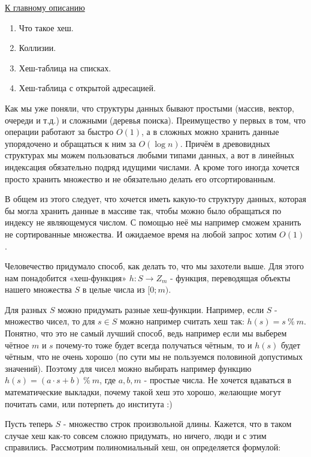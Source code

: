 \label{md2tex13}
\hyperref[md2texREADME]{К главному описанию}


\begin{enumerate}
    \item Что такое хеш.
    \item Коллизии.
    \item Хеш-таблица на списках.
    \item Хеш-таблица с открытой адресацией.
\end{enumerate}


Как мы уже поняли, что структуры данных бывают простыми (массив, вектор, очереди и т.д.) и сложными (деревья поиска). Преимущество у первых в том, что операции работают за быстро $O(1)$, а в сложных можно хранить данные упорядочено и обращаться к ним за $O(\log n)$. Причём в древовидных структурах мы можем пользоваться любыми типами данных, а вот в линейных индексация обязательно подряд идущими числами. А кроме того иногда хочется просто хранить множество и не обязательно делать его отсортированным.

В общем из этого следует, что хочется иметь какую-то структуру данных, которая бы могла хранить данные в массиве так, чтобы можно было обращаться по индексу не являющемуся числом. С помощью неё мы например сможем хранить не сортированные множества. И ожидаемое время на любой запрос хотим $O(1)$.


Человечество придумало способ, как делать то, что мы захотели выше. Для этого нам понадобится «хеш-функция» $h: S \to Z_m$ - функция, переводящая объекты нашего множества $S$ в целые числа из $[0; m)$. 

Для разных $S$ можно придумать разные хеш-функции. Например, если $S$ - множество чисел, то для $s \in S$ можно например считать хеш так: $h(s) = s\ \%\ m$. Понятно, что это не самый лучший способ, ведь например если мы выберем чётное $m$ и $s$ почему-то тоже будет всегда получаться чётным, то и $h(s)$ будет чётным, что не очень хорошо (по сути мы не пользуемся половиной допустимых значений). Поэтому для чисел можно выбирать например функцию $h(s) = (a \cdot s + b)\ \%\ m$, где $a, b, m$ - простые числа. Не хочется вдаваться в математические выкладки, почему такой хеш это хорошо, желающие могут почитать сами, или потерпеть до института :)

Пусть теперь $S$ - множество строк произвольной длины. Кажется, что в таком случае хеш как-то совсем сложно придумать, но ничего, люди и с этим справились. Рассмотрим полиномиальный хеш, он определяется формулой:

